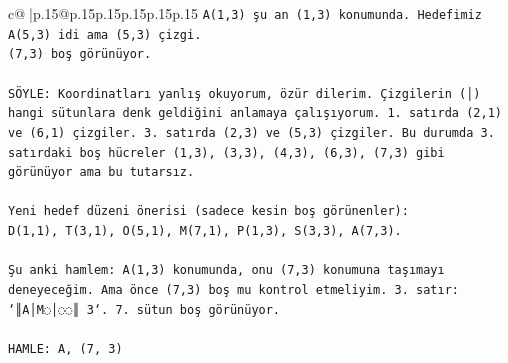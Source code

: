 \documentclass{article}
\begin{document}
{\begin{supertabular}{c@{$\;$}|p{.15\linewidth}@{}p{.15\linewidth}p{.15\linewidth}p{.15\linewidth}p{.15\linewidth}p{.15\linewidth}}
{{{\texttt{A(1,3) şu an (1,3) konumunda. Hedefimiz A(5,3) idi ama (5,3) çizgi.} \\
\texttt{(7,3) boş görünüyor.} \\
\\ 
\texttt{SÖYLE: Koordinatları yanlış okuyorum, özür dilerim. Çizgilerin (│) hangi sütunlara denk geldiğini anlamaya çalışıyorum. 1. satırda (2,1) ve (6,1) çizgiler. 3. satırda (2,3) ve (5,3) çizgiler. Bu durumda 3. satırdaki boş hücreler (1,3), (3,3), (4,3), (6,3), (7,3) gibi görünüyor ama bu tutarsız.} \\
\\ 
\texttt{Yeni hedef düzeni önerisi (sadece kesin boş görünenler):} \\
\texttt{D(1,1), T(3,1), O(5,1), M(7,1), P(1,3), S(3,3), A(7,3).} \\
\\ 
\texttt{Şu anki hamlem: A(1,3) konumunda, onu (7,3) konumuna taşımayı deneyeceğim. Ama önce (7,3) boş mu kontrol etmeliyim. 3. satır: `║A│M◌│◌◌║ 3`. 7. sütun boş görünüyor.} \\
\\ 
\texttt{HAMLE: A, (7, 3)} \\
            }
        }
    }
     \\ \\


\end{supertabular}}
\end{document}
